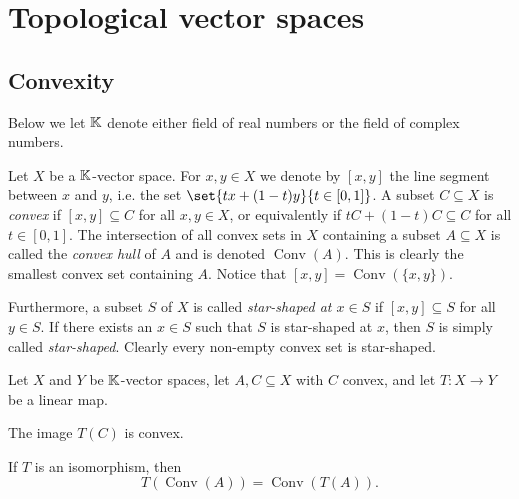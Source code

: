 \documentclass[article, a4paper, 11pt, oneside]{memoir}
\numberwithin{equation}{chapter}
\begin{document}
\chapter{Topological vector spaces}

\section{Convexity}

\newcommand{\conv}{\operatorname{Conv}}

Below we let $\mathbb{K}$ denote either field of real numbers or the field of complex numbers.

Let $X$ be a $\mathbb{K}$-vector space. For $x,y \in X$ we denote by $[x,y]$ the line segment between $x$ and $y$, i.e. the set $\set{tx + (1-t)y}{t \in [0,1]}$. A subset $C \subseteq X$ is \emph{convex} if $[x,y] \subseteq C$ for all $x,y \in X$, or equivalently if $tC + (1-t)C \subseteq C$ for all $t \in [0,1]$. The intersection of all convex sets in $X$ containing a subset $A \subseteq X$ is called the \emph{convex hull} of $A$ and is denoted $\conv(A)$. This is clearly the smallest convex set containing $A$. Notice that $[x,y] = \conv(\{x,y\})$.

Furthermore, a subset $S$ of $X$ is called \emph{star-shaped at $x \in S$} if $[x,y] \subseteq S$ for all $y \in S$. If there exists an $x \in S$ such that $S$ is star-shaped at $x$, then $S$ is simply called \emph{star-shaped}. Clearly every non-empty convex set is star-shaped.

\begin{lemma}
    Let $X$ and $Y$ be $\mathbb{K}$-vector spaces, let $A, C \subseteq X$ with $C$ convex, and let $T \colon X \to Y$ be a linear map.
    \begin{enumlem}
        \item \label{enum:image-of-convex-set} The image $T(C)$ is convex.
        \item \label{enum:convex-hull-isomorphism} If $T$ is an isomorphism, then
        \begin{equation*}
            T(\conv(A)) = \conv(T(A)).
        \end{equation*}
    \end{enumlem}
\end{lemma}
\end{document}
